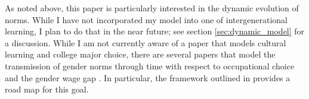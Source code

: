 











As noted above, this paper is particularly interested in the dynamic evolution of norms. 
While I have not incorporated my model into one of intergenerational learning, I plan to do that in the near future; see section \ref{sec:dynamic_model} for a discussion.
While I am not currently aware of a paper that models cultural learning and college major choice, there are several papers that model the transmission of gender norms through time with respect to occupational choice and the gender wage gap \parencite{F13,KLS19}.
In particular, the framework outlined in \textcite{F13} provides a road map for this goal.


